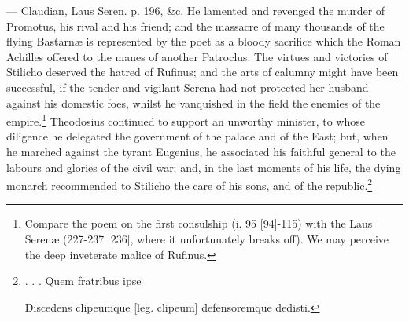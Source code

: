 {{—} Claudian, Laus Seren. p. 196, \&c.} He lamented and revenged the murder of Promotus, his rival and his friend; and the massacre of many thousands of the flying Bastarnæ is represented by the poet as a bloody sacrifice which the Roman Achilles offered to the manes of another Patroclus. The virtues and victories of Stilicho deserved the hatred of Rufinus; and the arts of calumny might have been successful, if the tender and vigilant Serena had not protected her husband against his domestic foes, whilst he vanquished in the field the enemies of the empire.\footnote{Compare the poem on the first consulship (i. 95 [94]-115) with the Laus Serenæ (227-237 [236], where it unfortunately breaks off). We may perceive the deep inveterate malice of Rufinus.} Theodosius continued to support an unworthy minister, to whose diligence he delegated the government of the palace and of the East; but, when he marched against the tyrant Eugenius, he associated his faithful general to the labours and glories of the civil war; and, in the last moments of his life, the dying monarch recommended to Stilicho the care of his sons, and of the republic.\footnote{. . . Quem fratribus ipse

Discedens clipeumque [leg. clipeum] defensoremque dedisti.

}
